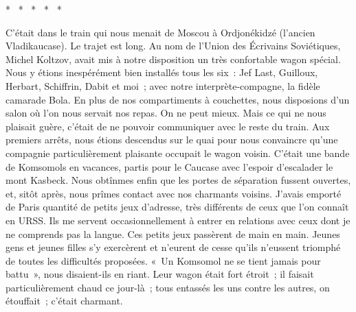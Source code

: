 \documentclass[french,twoside]{book} %
\begin{document}
\begin{center}
\noindent \centerline{*  *  *  *  *}\par
\end{center}

\noindent C’était dans le train qui nous menait de Moscou à Ordjonékidzé (l’ancien Vladikaucase). Le trajet est long. Au nom de l’Union des Écrivains Soviétiques, Michel Koltzov, avait mis à notre disposition un très confortable wagon spécial. Nous y étions inespérément bien installés tous les six : Jef Last, Guilloux, Herbart, Schiffrin, Dabit et moi ; avec notre interprète-compagne, la fidèle camarade Bola. En plus de nos compartiments à couchettes, nous disposions d’un salon où l’on nous servait nos repas. On ne peut mieux. Mais ce qui ne nous plaisait guère, c’était de ne pouvoir communiquer avec le reste du train. Aux premiers arrêts, nous étions descendus sur le quai pour nous convaincre qu’une compagnie particulièrement plaisante occupait le wagon voisin. C’était une bande de Komsomols en vacances, partis pour le Caucase avec l’espoir d’escalader le mont Kasbeck. Nous obtînmes enfin que les portes de séparation fussent ouvertes, et, sitôt après, nous prîmes contact avec nos charmants voisins. J’avais emporté de Paris quantité de petits jeux d’adresse, très différents de ceux que l’on connaît en URSS. Ils me servent occasionnellement à entrer en relations avec ceux dont je ne comprends pas la langue. Ces petits jeux passèrent de main en main. Jeunes gens et jeunes filles s’y exercèrent et n’eurent de cesse qu’ils n’eussent triomphé de toutes les difficultés proposées. « Un Komsomol ne se tient jamais pour battu », nous disaient-ils en riant. Leur wagon était fort étroit ; il faisait particulièrement chaud ce jour-là ; tous entassés les uns contre les autres, on étouffait ; c’était charmant.\par
\end{document}
